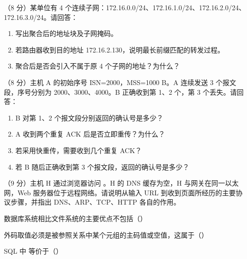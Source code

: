 \documentclass[a4paper,11pt]{article}
\begin{document}
\q （8 分）某单位有 4 个连续子网：172.16.0.0/24、172.16.1.0/24、172.16.2.0/24、172.16.3.0/24。请回答：
\begin{enumerate}[label=（\arabic*）, leftmargin=2.4em, itemsep=1pt]
  \item 写出聚合后的地址块及子网掩码。
  \item 若路由器收到目的地址 172.16.2.130，说明最长前缀匹配的转发过程。
  \item 聚合后是否会引入不属于原 4 个子网的地址？为什么？
\end{enumerate}
\anslines{6.5cm}

\q （8 分）主机 A 的初始序号 ISN=2000，MSS=1000 B。A 连续发送 3 个报文段，序号分别为 2000、3000、4000。B 正确收到第 1、2 个，第 3 个丢失。请回答：
\begin{enumerate}[label=（\arabic*）, leftmargin=2.4em, itemsep=1pt]
  \item B 对第 1、2 个报文段分别返回的确认号是多少？
  \item A 收到两个重复 ACK 后是否立即重传？为什么？
  \item 若采用快重传，需要收到几个重复 ACK？
  \item 若 B 随后正确收到第 3 个报文段，返回的确认号是多少？
\end{enumerate}
\anslines{6cm}

\q （9 分）主机 H 通过浏览器访问 。H 的 DNS 缓存为空，H 与网关在同一以太网，Web 服务器位于远程网络。请说明从输入 URL 到收到页面所经历的主要协议步骤，并指出 DNS、ARP、TCP、HTTP 各自的作用。
\anslines{8cm}



\q 数据库系统相比文件系统的主要优点不包括（\quad）

\q 外码取值必须是被参照关系中某个元组的主码值或空值，这属于（\quad）

\q SQL 中  等价于（\quad）
\end{document}
